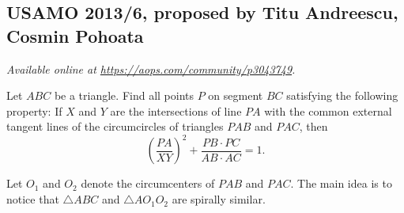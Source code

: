 \documentclass[11pt]{scrartcl}
\begin{document}
\subsection{USAMO 2013/6, proposed by Titu Andreescu, Cosmin Pohoata}
\textsl{Available online at \url{https://aops.com/community/p3043749}.}
\begin{mdframed}[style=mdpurplebox,frametitle={Problem statement}]
Let $ABC$ be a triangle.
Find all points $P$ on segment $BC$ satisfying the following property:
If $X$ and $Y$ are the intersections of line $PA$ with the common external
tangent lines of the circumcircles of triangles $PAB$ and $PAC$, then
\[ \left( \frac{PA}{XY} \right)^2 + \frac{PB\cdot PC}{AB\cdot AC} = 1.\]
\end{mdframed}
Let $O_1$ and $O_2$ denote the circumcenters of $PAB$ and $PAC$.
The main idea is to notice that $\triangle ABC$ and $\triangle AO_1O_2$
are spirally similar.
\end{document}
